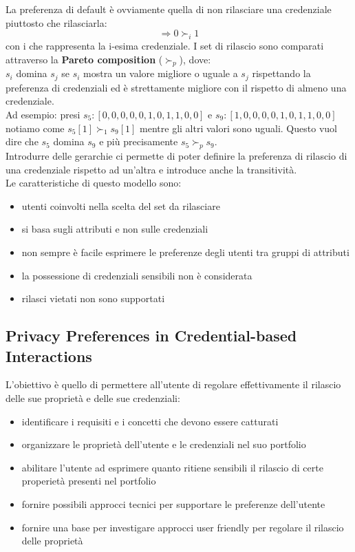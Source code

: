 La preferenza di default è ovviamente quella di non rilasciare una credenziale piuttosto che rilasciarla:
\[ \Longrightarrow 0 \succ_i 1 \]
con i che rappresenta la i-esima credenziale. I set di rilascio sono comparati attraverso la \textbf{Pareto composition} (\(\succ_p\)), dove:\\
\(s_i\) domina \(s_j\) se \(s_i\) mostra un valore migliore o uguale a \(s_j\) rispettando la preferenza di credenziali ed è strettamente migliore con il rispetto di almeno una credenziale.\\
Ad esempio: presi \(s_5 : [0, 0, 0, 0, 0, 1, 0, 1, 1, 0, 0]\) e \(s_9 : [1, 0, 0, 0, 0, 1, 0, 1, 1, 0, 0]\) 
notiamo come \(s_5[1] \succ_1 s_9[1]\) mentre gli altri valori sono uguali. Questo vuol dire che \(s_5\) domina \(s_9\) e più precisamente \(s_5 \succ_p s_9\).\\
Introdurre delle gerarchie ci permette di poter definire la preferenza di rilascio di una credenziale rispetto ad un'altra e introduce anche la transitività.\\
Le caratteristiche di questo modello sono:
\begin{itemize}
    \item utenti coinvolti nella scelta del set da rilasciare
    \item si basa sugli attributi e non sulle credenziali
    \item non sempre è facile esprimere le preferenze degli utenti tra gruppi di attributi
    \item la possessione di credenziali sensibili non è considerata
    \item rilasci vietati non sono supportati
\end{itemize}


\subsection{Privacy Preferences in Credential-based Interactions}
L'obiettivo è quello di permettere all'utente di regolare effettivamente il rilascio delle sue proprietà e delle sue credenziali:
\begin{itemize}
    \item identificare i requisiti e i concetti che devono essere catturati
    \item organizzare le proprietà dell'utente e le credenziali nel suo portfolio
    \item abilitare l'utente ad esprimere quanto ritiene sensibili il rilascio di certe properietà presenti nel portfolio
    \item fornire possibili approcci tecnici per supportare le preferenze dell'utente
    \item fornire una base per investigare approcci user friendly per regolare il rilascio delle proprietà
\end{itemize}
